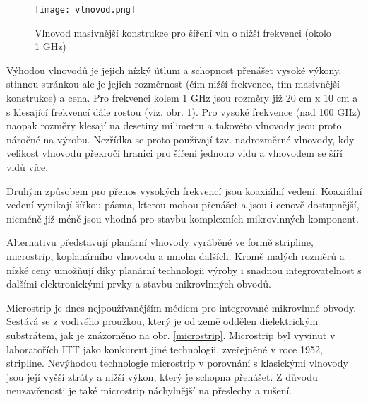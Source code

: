 \documentclass[12pt,a4paper,oneside]{article}
\numberwithin{equation}{section} %
\numberwithin{figure}{section} %
\numberwithin{table}{section} %
\begin{document}

\begin{figure}[h] 
\begin{center}
\texttt{[image: vlnovod.png]}
\caption{Vlnovod masivnější konstrukce pro šíření vln o nižší frekvenci (okolo 1 GHz)}
\label{vlnovod}
\end{center}
\end{figure}

Výhodou vlnovodů je jejich nízký útlum a schopnost přenášet vysoké výkony, stinnou stránkou ale je jejich rozměrnost (čím nižší frekvence, tím masivnější konstrukce) a cena. Pro frekvenci kolem 1 GHz jsou rozměry již 20 cm x 10 cm a s klesající frekvencí dále rostou (viz. obr. \ref{vlnovod}). Pro vysoké frekvence (nad 100 GHz) naopak rozměry klesají na desetiny milimetru a takovéto vlnovody jsou proto náročné na výrobu. Nezřídka se proto používají tzv. nadrozměrné vlnovody, kdy velikost vlnovodu překročí hranici pro šíření jednoho vidu a vlnovodem se šíří vidů více. \cite{Dimensions}

Druhým způsobem pro přenos vysokých frekvencí jsou koaxiální vedení. Koaxiální vedení vynikají šířkou pásma, kterou mohou přenášet a jsou i cenově dostupnější, nicméně již méně jsou vhodná pro stavbu komplexních mikrovlnných komponent.

Alternativu představují planární vlnovody vyráběné ve formě stripline, microstrip, koplanárního vlnovodu a mnoha dalších. Kromě malých rozměrů a nízké ceny umožňují díky planární technologii výroby i snadnou integrovatelnost s dalšími elektronickými prvky a stavbu mikrovlnných obvodů.

Microstrip je dnes nejpoužívanějším médiem pro integrované mikrovlnné obvody. Sestává se z vodivého proužkou, který je od země oddělen dielektrickým substrátem, jak je znázorněno na obr. \ref{microstrip}. Microstrip byl vyvinut v laboratořích ITT jako konkurent jiné technologii, zveřejněné v roce 1952, stripline. Nevýhodou technologie microstrip v porovnání s klasickými vlnovody jsou její vyšší ztráty a nižší výkon, který je schopna přenášet. Z důvodu neuzavřenosti je také microstrip náchylnější na přeslechy a rušení.
\end{document}
